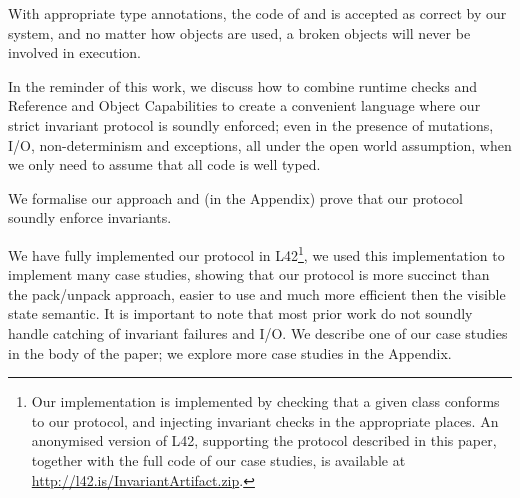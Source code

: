With appropriate type annotations, the code of \Q@Range@ and \Q@BoxRange@ is accepted as correct by our system, and no matter how \Q@Range@ objects are used, a broken \Q@Range@ objects will never be involved in execution.

In the reminder of this work, we discuss how to combine runtime checks and Reference and Object Capabilities to create a convenient language where our strict invariant protocol is soundly enforced; even in the presence of mutations, I/O, non-determinism and exceptions, all under the open world assumption, when
we only need to assume that all code is well typed.

We formalise our approach and (in the Appendix) prove that our protocol soundly enforce invariants.

We have fully implemented our protocol in L42\footnote{
Our implementation is implemented by checking that a given class conforms to our protocol, and injecting invariant checks in the appropriate places.
An anonymised version of L42, supporting the protocol described in this paper, together with the full code of our case studies, is available at \url{http://l42.is/InvariantArtifact.zip}. %
}, we used this implementation to implement many case studies, showing that our protocol is more succinct than the pack/unpack approach, easier to use and much more efficient then the visible state semantic.
It is important to note that most prior work do not soundly handle catching of invariant failures and I/O.
We describe one of our case studies in the body of the paper; we explore more case studies in the Appendix.


